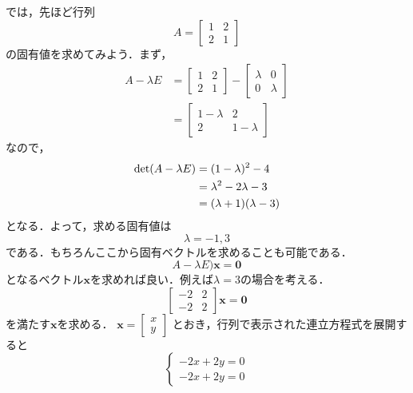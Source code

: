 \documentclass[a4paper,12pt,autodetect-engine,dvipdfmx]{jsarticle}
\theoremstyle{definition}
\begin{document}
では，先ほど行列
\begin{equation*}
    A=
    \begin{bmatrix}
        1 & 2\\
        2 & 1
    \end{bmatrix}
\end{equation*}
の固有値を求めてみよう．まず，
\begin{align*}
    A - \lambda E
    &=
    \begin{bmatrix}
        1 & 2\\
        2 & 1
    \end{bmatrix}
    - 
    \begin{bmatrix}
        \lambda & 0\\
        0 & \lambda
    \end{bmatrix}\\
    &= 
    \begin{bmatrix}
        1-\lambda & 2\\
        2 & 1-\lambda
    \end{bmatrix}
\end{align*}
なので，
\begin{align*}
    {\rm{det}}(A-\lambda E)
    &=
    (1-\lambda)^2 - 4\\
    &={\lambda}^2-2\lambda - 3\\
    &=(\lambda + 1)(\lambda - 3)
\end{align*}
となる．よって，求める固有値は
\begin{equation}
    \lambda = -1,3 \label{eq.6.1}
\end{equation}
である．もちろんここから固有ベクトルを求めることも可能である．
\begin{equation*}
    A - \lambda E)\bm{x} = \bm{0}
\end{equation*}
となるベクトル$\bm{x}$を求めれば良い．例えば$\lambda = 3$の場合を考える．
\begin{equation*}
    \begin{bmatrix}
        -2 & 2\\
        -2 & 2
    \end{bmatrix}
    \bm{x}
    = \bm{0}
\end{equation*}
を満たす$\bm{x}$を求める．
$\bm{x} = 
\begin{bmatrix}
    x\\
    y
\end{bmatrix}$
とおき，行列で表示された連立方程式を展開すると
\begin{equation*}
    \begin{cases}
        -2x + 2y = 0\\
        -2x + 2y = 0
    \end{cases}
\end{equation*}
\end{document}
